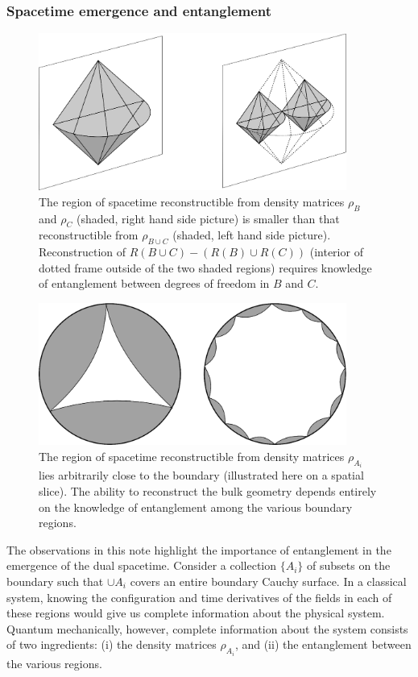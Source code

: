 \documentclass[12pt]{article}
\renewcommand{\(}{\left(}
\renewcommand{\)}{\right)}
\begin{document}
\subsubsection*{Spacetime emergence and entanglement}

\begin{figure}
\centering
\includegraphics[width=0.9\textwidth]{entanglement-1-and-2.eps}
\caption{The region of spacetime reconstructible from density matrices $\rho_B$ and $\rho_C$ (shaded, right hand side picture) is smaller than that reconstructible from $\rho_{B \cup C}$ (shaded, left hand side picture). Reconstruction of $R(B \cup C) - (R(B)\cup R(C))$ (interior of dotted frame outside of the two shaded regions) requires knowledge of entanglement between degrees of freedom in $B$ and $C$.}
\label{j1}
\end{figure}

\begin{figure}
\centering
\includegraphics[width=0.9\textwidth]{entanglement-3-and-many.eps}
\caption{The region of spacetime reconstructible from density matrices $\rho_{A_i}$ lies arbitrarily close to the boundary (illustrated here on a spatial slice). The ability to reconstruct the bulk geometry depends entirely on the knowledge of entanglement among the various boundary regions.}
\label{wianek}
\end{figure}

The observations in this note highlight the importance of entanglement in the emergence of the dual spacetime. Consider a collection $\{A_i\}$ of subsets on the boundary such that $\cup A_i$ covers an entire boundary Cauchy surface. In a classical system, knowing the configuration and time derivatives of the fields in each of these regions would give us complete information about the physical system. Quantum mechanically, however, complete information about the system consists of two ingredients: (i) the density matrices $\rho_{A_i}$, and (ii) the entanglement between the various regions.
\end{document}
